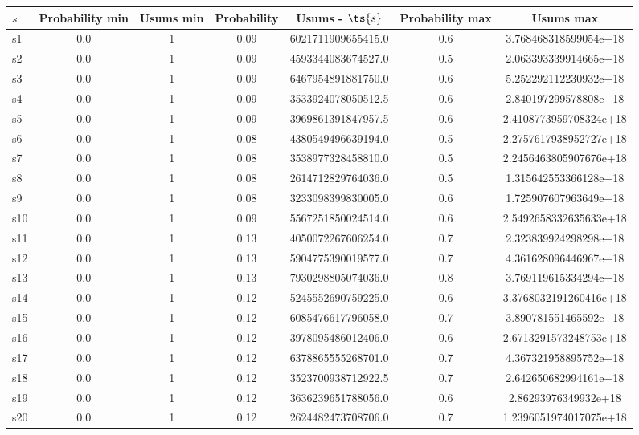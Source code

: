 \documentclass{article}
\begin{document}
\noindent\begin{tabular}{|l|c|c|c|c|c|c|}
\hline
$s$& Probability min & Usums min & Probability & Usums - $\ts{s}$ & Probability max & Usums max\\
\hline
s1 &0.0 & 1 & 0.09 & 6021711909655415.0 & 0.6 & 3.768468318599054e+18\\
\hline
s2 &0.0 & 1 & 0.09 & 4593344083674527.0 & 0.5 & 2.063393339914665e+18\\
\hline
s3 &0.0 & 1 & 0.09 & 6467954891881750.0 & 0.6 & 5.252292112230932e+18\\
\hline
s4 &0.0 & 1 & 0.09 & 3533924078050512.5 & 0.6 & 2.840197299578808e+18\\
\hline
s5 &0.0 & 1 & 0.09 & 3969861391847957.5 & 0.6 & 2.4108773959708324e+18\\
\hline
s6 &0.0 & 1 & 0.08 & 4380549496639194.0 & 0.5 & 2.2757617938952727e+18\\
\hline
s7 &0.0 & 1 & 0.08 & 3538977328458810.0 & 0.5 & 2.2456463805907676e+18\\
\hline
s8 &0.0 & 1 & 0.08 & 2614712829764036.0 & 0.5 & 1.315642553366128e+18\\
\hline
s9 &0.0 & 1 & 0.08 & 3233098399830005.0 & 0.6 & 1.725907607963649e+18\\
\hline
s10 &0.0 & 1 & 0.09 & 5567251850024514.0 & 0.6 & 2.5492658332635633e+18\\
\hline
s11 &0.0 & 1 & 0.13 & 4050072267606254.0 & 0.7 & 2.323839924298298e+18\\
\hline
s12 &0.0 & 1 & 0.13 & 5904775390019577.0 & 0.7 & 4.361628096446967e+18\\
\hline
s13 &0.0 & 1 & 0.13 & 7930298805074036.0 & 0.8 & 3.769119615334294e+18\\
\hline
s14 &0.0 & 1 & 0.12 & 5245552690759225.0 & 0.6 & 3.3768032191260416e+18\\
\hline
s15 &0.0 & 1 & 0.12 & 6085476617796058.0 & 0.7 & 3.890781551465592e+18\\
\hline
s16 &0.0 & 1 & 0.12 & 3978095486012406.0 & 0.6 & 2.6713291573248753e+18\\
\hline
s17 &0.0 & 1 & 0.12 & 6378865555268701.0 & 0.7 & 4.367321958895752e+18\\
\hline
s18 &0.0 & 1 & 0.12 & 3523700938712922.5 & 0.7 & 2.642650682994161e+18\\
\hline
s19 &0.0 & 1 & 0.12 & 3636239651788056.0 & 0.6 & 2.86293976349932e+18\\
\hline
s20 &0.0 & 1 & 0.12 & 2624482473708706.0 & 0.7 & 1.2396051974017075e+18\\

\end{tabular}
\end{document}

